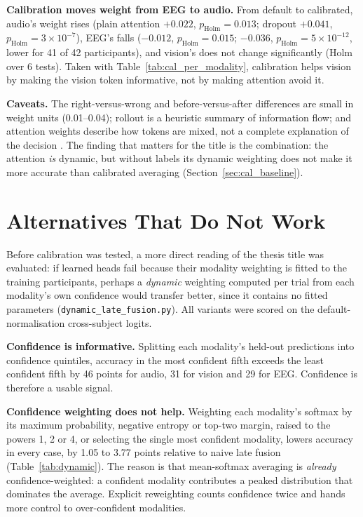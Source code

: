 \textbf{Calibration moves weight from EEG to audio.} From default to calibrated, audio's
weight rises (plain attention $+0.022$, $p_{\mathrm{Holm}} = 0.013$; dropout $+0.041$,
$p_{\mathrm{Holm}} = 3\times10^{-7}$), EEG's falls ($-0.012$, $p_{\mathrm{Holm}} =
0.015$; $-0.036$, $p_{\mathrm{Holm}} = 5\times10^{-12}$, lower for 41 of 42
participants), and vision's does not change significantly (Holm over 6 tests). Taken
with Table~\ref{tab:cal_per_modality}, calibration helps vision by making the vision
token informative, not by making attention avoid it.

\textbf{Caveats.} The right-versus-wrong and before-versus-after differences are small in weight units (0.01--0.04);
rollout is a heuristic summary of information flow; and attention weights describe how
tokens are mixed, not a complete explanation of the decision
\cite{Jain2019AttentionNot}. The finding that matters for the title is the combination:
the attention \emph{is} dynamic, but without labels its dynamic weighting does not make
it more accurate than calibrated averaging (Section~\ref{sec:cal_baseline}).

\section{Alternatives That Do Not Work}
\label{sec:cal_negative}

Before calibration was tested, a more direct reading of the thesis title was
evaluated: if learned heads fail because their modality weighting is fitted to the
training participants, perhaps a \emph{dynamic} weighting computed per trial from
each modality's own confidence would transfer better, since it contains no fitted
parameters (\texttt{dynamic\_late\_fusion.py}). All variants were scored on the
default-normalisation cross-subject logits.

\textbf{Confidence is informative.} Splitting each modality's held-out predictions
into confidence quintiles, accuracy in the most confident fifth exceeds the least
confident fifth by 46 points for audio, 31 for vision and 29 for EEG. Confidence is
therefore a usable signal.

\textbf{Confidence weighting does not help.} Weighting each modality's softmax by
its maximum probability, negative entropy or top-two margin, raised to the powers 1,
2 or 4, or selecting the single most confident modality, lowers accuracy in every
case, by 1.05 to 3.77 points relative to naive late fusion (Table~\ref{tab:dynamic}).
The reason is that mean-softmax averaging is \emph{already} confidence-weighted: a
confident modality contributes a peaked distribution that dominates the average.
Explicit reweighting counts confidence twice and hands more control to over-confident
modalities.

